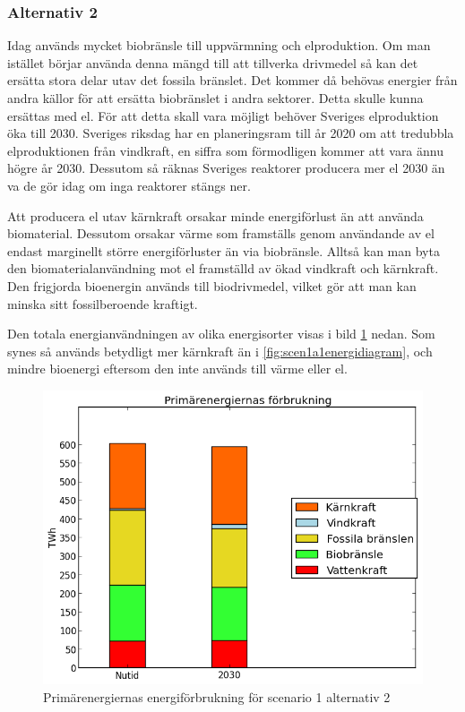 \documentclass[a4paper,11pt,fleqn, titlepage]{article}
\begin{document}
\subsubsection{Alternativ 2}

Idag används mycket biobränsle till uppvärmning och elproduktion. Om man istället börjar använda denna mängd till att tillverka drivmedel så kan det ersätta stora delar utav det fossila bränslet. Det kommer då behövas energier från andra källor för att ersätta biobränslet i andra sektorer. Detta skulle kunna ersättas med el. För att detta skall vara möjligt behöver Sveriges elproduktion öka till 2030. Sveriges riksdag har en planeringsram till år 2020 om att tredubbla elproduktionen från vindkraft, en siffra som förmodligen kommer att vara ännu högre år 2030. Dessutom så räknas Sveriges reaktorer producera mer el 2030 än va de gör idag om inga reaktorer stängs ner\cite{energimyndigheten}.

Att producera el utav kärnkraft orsakar minde energiförlust än att använda biomaterial. Dessutom orsakar värme som framställs genom användande av el endast marginellt större energiförluster än via biobränsle. Alltså kan man byta den biomaterialanvändning mot el framställd av ökad vindkraft och kärnkraft. Den frigjorda bioenergin används till biodrivmedel, vilket gör att man kan minska sitt fossilberoende kraftigt.

Den totala energianvändningen av olika energisorter visas i bild \ref{fig:scen1a2energidiagram} nedan. Som synes så används betydligt mer kärnkraft än i \ref{fig:scen1a1energidiagram}, och mindre bioenergi eftersom den inte används till värme eller el.

\begin{figure}[h!]
       \centering
       \includegraphics[scale=0.7]{scen1a2energidiagram.png}
       \caption{Primärenergiernas energiförbrukning för scenario 1 alternativ 2}
       \label{fig:scen1a2energidiagram}
\end{figure}
\end{document}
